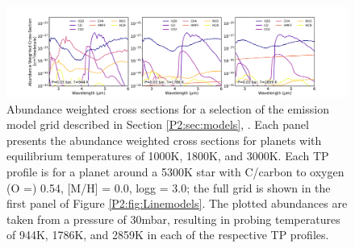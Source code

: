 \begin{figure}
    \centering
    \includegraphics[width=\linewidth]{opacities.pdf}
    \caption{Abundance weighted cross sections for a selection of the emission model grid described in Section \ref{P2:sec:models}, \citep{Piskorz2018}. Each panel presents the abundance weighted cross sections for planets with equilibrium temperatures of 1000K, 1800K, and 3000K. Each TP profile is for a planet around a 5300K star with C/carbon to oxygen (O =) 0.54, [M/H] = 0.0, logg = 3.0; the full grid is shown in the first panel of Figure \ref{P2:fig:Linemodels}. The plotted abundances are taken from a pressure of 30mbar, resulting in probing temperatures of 944K, 1786K, and 2859K in each of the respective TP profiles.}
    \label{P2:fig:opacities}
\end{figure}


